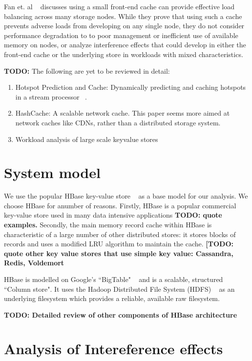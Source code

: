 \documentclass[twocolumn]{article}
\begin{document}
Fan et. al ~\cite{Fan:2011:SCB:2038916.2038939} discusses using a small front-end cache can provide effective load balancing across many storage nodes. While they prove that using such a cache prevents adverse loads from developing on any single node, they do not consider performance degradation to to poor management or inefficient use of available memory on nodes, or analyze interference effects that could develop in either the front-end cache or the underlying store in workloads with mixed characteristics.

\textbf{TODO:} The following are yet to be reviewed in detail:
\begin{enumerate}
\item Hotspot Prediction and Cache: Dynamically predicting and caching hotspots in a stream processor ~\cite{5403810}.
\item HashCache: A scalable network cache. This paper seems more aimed at network caches like CDNs, rather than a distributed storage system. ~\cite{Badam:2009:HCS:1558977.1558986}
\item Workload analysis of large scale keyvalue stores ~\cite{Atikoglu:2012:WAL:2318857.2254766}
\end{enumerate}

\section{System model}
\label{sec:system}
We use the popular HBase key-value store ~\cite {HBase:2013:Online} as a base model for our analysis. We choose HBase for anumber of reasons. Firstly, HBase is a popular commercial key-value store used in many data intensive applications \textbf{TODO: quote examples.} Secondly, the main memory record cache within HBase is characteristic of a large number of other distributed stores: it stores blocks of records and uses a modified LRU algorithm to maintain the cache. \textbf{[TODO: quote other key value stores that use simple key value: Cassandra, Redis, Voldemort }

HBase is modelled on Google's ``BigTable" ~\cite{Chang:2006:BDS:1267308.1267323} and is a scalable, structured ``Column store". It uses the Hadoop Distributed File System (HDFS) ~\cite{HDFS:2013:Online} as an underlying filesystem which provides a reliable, available raw filesystem. 


\textbf{TODO: Detailed review of other components of HBase architecture}

\section{Analysis of Intereference effects}
\label{sec:experiment}
\end{document}
